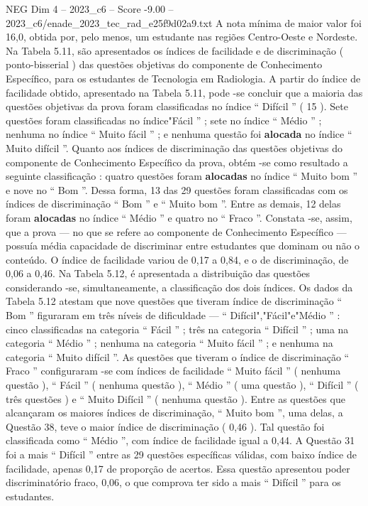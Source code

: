 \begin{textsample}{NEG Dim 4 – 2023\_c6 – Score -9.00 – 2023\_c6/enade\_2023\_tec\_rad\_e25f9d02a9.txt}
A nota mínima de maior valor foi 16,0, obtida por, pelo menos, um estudante nas regiões Centro-Oeste e Nordeste.
Na Tabela 5.11, são apresentados os índices de facilidade e de discriminação ( ponto-bisserial ) das questões objetivas do componente de Conhecimento Específico, para os estudantes de Tecnologia em Radiologia.
A partir do índice de facilidade obtido, apresentado na Tabela 5.11, pode -se concluir que a maioria das questões objetivas da prova foram classificadas no índice “ Difícil ” ( 15 ).
Sete questões foram classificadas no índice"Fácil ” ; sete no índice “ Médio ” ; nenhuma no índice “ Muito fácil ” ; e nenhuma questão foi \textbf{alocada} no índice “ Muito difícil ”.
Quanto aos índices de discriminação das questões objetivas do componente de Conhecimento Específico da prova, obtém -se como resultado a seguinte classificação : quatro questões foram \textbf{alocadas} no índice “ Muito bom ” e nove no “ Bom ”.
Dessa forma, 13 das 29 questões foram classificadas com os índices de discriminação “ Bom ” e “ Muito bom ”.
Entre as demais, 12 delas foram \textbf{alocadas} no índice “ Médio ” e quatro no “ Fraco ”.
Constata -se, assim, que a prova — no que se refere ao componente de Conhecimento Específico — possuía média capacidade de discriminar entre estudantes que dominam ou não o conteúdo.
O índice de facilidade variou de 0,17 a 0,84, e o de discriminação, de 0,06 a 0,46.
Na Tabela 5.12, é apresentada a distribuição das questões considerando -se, simultaneamente, a classificação dos dois índices.
Os dados da Tabela 5.12 atestam que nove questões que tiveram índice de discriminação “ Bom ” figuraram em três níveis de dificuldade — “ Difícil","Fácil"e"Médio ” : cinco classificadas na categoria “ Fácil ” ; três na categoria “ Difícil ” ; uma na categoria “ Médio ” ; nenhuma na categoria “ Muito fácil ” ; e nenhuma na categoria “ Muito difícil ”.
As questões que tiveram o índice de discriminação “ Fraco ” configuraram -se com índices de facilidade “ Muito fácil ” ( nenhuma questão ), “ Fácil ” ( nenhuma questão ), “ Médio ” ( uma questão ), “ Difícil ” ( três questões ) e “ Muito Difícil ” ( nenhuma questão ).
Entre as questões que alcançaram os maiores índices de discriminação, “ Muito bom ”, uma delas, a Questão 38, teve o maior índice de discriminação ( 0,46 ).
Tal questão foi classificada como “ Médio ”, com índice de facilidade igual a 0,44.
A Questão 31 foi a mais “ Difícil ” entre as 29 questões específicas válidas, com baixo índice de facilidade, apenas 0,17 de proporção de acertos.
Essa questão apresentou poder discriminatório fraco, 0,06, o que comprova ter sido a mais “ Difícil ” para os estudantes.

\end{textsample}
